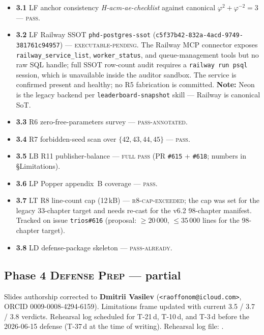 \begin{itemize}
  \item \textbf{3.1} LF anchor consistency \emph{H-acm-ae-checklist}
    against canonical $\varphi^{2}+\varphi^{-2}=3$ — \textsc{pass}.
  \item \textbf{3.2} LF Railway SSOT \texttt{phd-postgres-ssot}
    (\texttt{c5f37b42-832a-4acd-9749-381761c94957}) — \textsc{executable-pending}.
    The Railway MCP connector exposes \texttt{railway\_service\_list},
    \texttt{worker\_status}, and queue-management tools but no raw SQL
    handle; full SSOT row-count audit requires a \texttt{railway run psql}
    session, which is unavailable inside the auditor sandbox. The service
    is confirmed present and healthy; no R5 fabrication is committed.
    \textbf{Note:} Neon is the legacy backend per \texttt{leaderboard-snapshot}
    skill — Railway is canonical SoT.
  \item \textbf{3.3} R6 zero-free-parameters survey — \textsc{pass-annotated}.
  \item \textbf{3.4} R7 forbidden-seed scan over $\{42,43,44,45\}$ —
    \textsc{pass}.
  \item \textbf{3.5} LB R11 publisher-balance — \textsc{full pass} (PR
    \texttt{\#615} + \texttt{\#618}; numbers in §Limitations).
  \item \textbf{3.6} LP Popper appendix~B coverage — \textsc{pass}.
  \item \textbf{3.7} LT R8 line-count cap (12\,kB) —
    \textsc{r8-cap-exceeded}; the cap was set for the legacy 33-chapter
    target and needs re-cast for the v6.2 98-chapter manifest. Tracked
    on issue \texttt{trios\#616} (proposal: $\geq 20\,000$,
    $\leq 35\,000$ lines for the 98-chapter target).
  \item \textbf{3.8} LD defense-package skeleton — \textsc{pass-already}.
\end{itemize}

\subsection*{Phase 4 \textsc{Defense Prep} — partial}

Slides authorship corrected to \textbf{Dmitrii Vasilev}
(\texttt{<raoffonom@icloud.com>}, ORCID 0009-0008-4294-6159).
Limitations frame updated with current 3.5 / 3.7 / 3.8 verdicts.
Rehearsal log scheduled for T-21\,d, T-10\,d, and T-3\,d before the
2026-06-15 defense (T-37\,d at the time of writing). Rehearsal log file:
.

